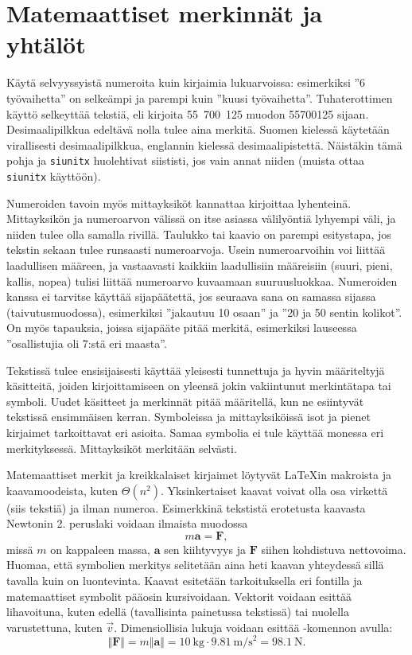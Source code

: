 \section{Matemaattiset merkinnät ja yhtälöt}

Käytä selvyyssyistä  numeroita kuin kirjaimia lukuarvoissa: esimerkiksi ''6 työvaihetta'' on selkeämpi ja parempi kuin ''kuusi työvaihetta''. Tuhaterottimen käyttö selkeyttää tekstiä, eli kirjoita 55~700~125 muodon 55700125 sijaan. Desimaalipilkkua edeltävä nolla tulee aina merkitä. Suomen kielessä käytetään virallisesti desimaalipilkkua, englannin kielessä desimaalipistettä. Näistäkin tämä pohja ja \texttt{siunitx} \parencite{siunitx} huolehtivat siististi, jos vain annat niiden (muista ottaa \texttt{siunitx} käyttöön).

Numeroiden tavoin myös mittayksiköt kannattaa kirjoittaa lyhenteinä. Mittayksikön ja numeroarvon välissä on itse asiassa välilyöntiä lyhyempi väli, ja niiden tulee olla samalla rivillä. Taulukko tai kaavio on parempi esitystapa, jos tekstin sekaan tulee runsaasti numeroarvoja. Usein numeroarvoihin voi liittää laadullisen määreen, ja vastaavasti kaikkiin laadullisiin määreisiin (suuri, pieni, kallis, nopea) tulisi liittää numeroarvo kuvaamaan suuruusluokkaa. Numeroiden kanssa ei tarvitse käyttää sijapäätettä, jos seuraava sana on samassa sijassa (taivutusmuodossa), esimerkiksi ''jakautuu 10 osaan'' ja ''20 ja 50 sentin kolikot''. On myös tapauksia, joissa sijapääte pitää merkitä, esimerkiksi lauseessa ''osallistujia oli 7:stä eri maasta''.

Tekstissä tulee ensisijaisesti käyttää yleisesti tunnettuja ja hyvin määriteltyjä käsitteitä, joiden kirjoittamiseen on yleensä jokin vakiintunut merkintätapa tai symboli. Uudet käsitteet ja merkinnät pitää määritellä, kun ne esiintyvät tekstissä ensimmäisen kerran. Symboleissa ja mittayksiköissä isot ja pienet kirjaimet tarkoittavat eri asioita. Samaa symbolia ei tule käyttää monessa eri merkityksessä. Mittayksiköt merkitään selvästi.

Matemaattiset merkit ja kreikkalaiset kirjaimet löytyvät \LaTeX{}in makroista ja kaavamoodeista, kuten $\Theta(n^2)$. Yksinkertaiset kaavat voivat olla osa virkettä (siis tekstiä) ja ilman numeroa. Esimerkkinä tekstistä erotetusta kaavasta Newtonin 2. peruslaki voidaan ilmaista muodossa
\begin{equation}\label{eq:newton2}
    m\mathbf{a} = \mathbf{F},
\end{equation}
missä $m$ on kappaleen massa, $\mathbf{a}$ sen kiihtyvyys ja $\mathbf{F}$ siihen kohdistuva nettovoima. Huomaa, että symbolien merkitys selitetään aina heti kaavan yhteydessä sillä tavalla kuin on luontevinta. Kaavat esitetään tarkoituksella eri fontilla ja matemaattiset symbolit pääosin kursivoidaan. Vektorit voidaan esittää lihavoituna, kuten edellä (tavallisinta painetussa tekstissä) tai nuolella varustettuna, kuten $\vec{v}$. Dimensiollisia lukuja voidaan esittää -komennon avulla:
\begin{equation*}
    \Vert\mathbf{F}\Vert = m\Vert\mathbf{a}\Vert = \SI{10}{\kilogram} \cdot \SI{9.81}{\metre\per\second\squared} = \SI{98.1}{\newton}.
\end{equation*}

